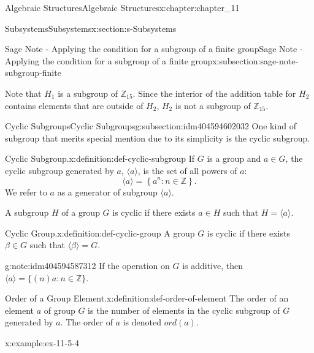 \documentclass[twoside,10pt,]{book}
\numberwithin{equation}{section}
\begin{document}
\begin{chapterptx}{Algebraic Structures}{}{Algebraic Structures}{}{}{x:chapter:chapter_11}
\begin{sectionptx}{Subsystems}{}{Subsystems}{}{}{x:section:s-Subsystems}
\begin{subsectionptx}{Sage Note - Applying the condition for a subgroup of a finite group}{}{Sage Note - Applying the condition for a subgroup of a finite group}{}{}{x:subsection:sage-note-subgroup-finite}
\begin{sageinput}
\end{sageinput}
\begin{sageoutput}
[0, 10, 5]
[10, 5, 0]
[5, 0, 10]
\end{sageoutput}
Note that \(H_1\) is a subgroup of \(\mathbb{Z}_{15}\). Since the interior of the addition table for \(H_2\) contains elements that are outside of \(H_2\), \(H_2\) is not a subgroup of \(\mathbb{Z}_{15}\).%
\end{subsectionptx}
%
%
\typeout{************************************************}
\typeout{************************************************}
%
\begin{subsectionptx}{Cyclic Subgroups}{}{Cyclic Subgroups}{}{}{g:subsection:idm404594602032}
One kind of subgroup that merits special mention due to its simplicity is the cyclic subgroup.%
\begin{definition}{Cyclic Subgroup.}{x:definition:def-cyclic-subgroup}%
%
%
\label{g:notation:idm404594597552}%
If \(G\) is a group and \(a \in  G\), the cyclic subgroup generated by \(a\), \(\langle a \rangle\), is the set of all powers of \(a\):%
\begin{equation*}
\langle a \rangle = \left\{a^n: n \in  \mathbb{Z}\right\}\text{.}
\end{equation*}
We refer to \(a\) as a generator of subgroup \(\langle a \rangle\).%
\par
A subgroup \(H\) of a group \(G\) is cyclic if there exists \(a \in  H\) such that \(H = \langle a \rangle\).%
\end{definition}
\begin{definition}{Cyclic Group.}{x:definition:def-cyclic-group}%
%
A group \(G\)  is cyclic if there exists \(\beta \in G\) such that \(\langle \beta \rangle=G\).%
\end{definition}
\begin{note}{}{g:note:idm404594587312}%
If the operation on \(G\) is additive, then \(\langle a \rangle = \{(n)a : n \in  \mathbb{Z}\}\).%
\end{note}
\begin{definition}{Order of a Group Element.}{x:definition:def-order-of-element}%
%
\label{g:notation:idm404594585024}%
The order of an element \(a\) of group \(G\) is the number of elements in the cyclic subgroup of \(G\) generated by \(a\). The order of \(a\) is denoted \(ord(a)\).%
\end{definition}
\begin{example}{}{x:example:ex-11-5-4}%

\end{example}
\end{subsectionptx}
\end{sectionptx}
\end{chapterptx}
\end{document}
